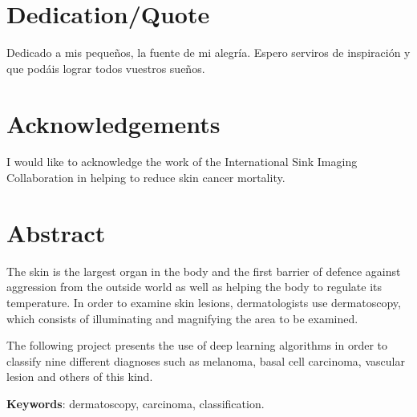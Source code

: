 \chapter*{Dedication/Quote}

Dedicado a mis pequeños, la fuente de mi alegría. Espero serviros de inspiración y que podáis lograr todos vuestros sueños. 

\chapter*{Acknowledgements}

I would like to acknowledge the work of the International Sink Imaging Collaboration \cite{isic_web} in helping to reduce skin cancer mortality.

\chapter*{Abstract}

\onehalfspacing

The skin is the largest organ in the body and the first barrier of defence against aggression from the outside world as well as helping the body to regulate its temperature. In order to examine skin lesions, dermatologists use dermatoscopy, which consists of illuminating and magnifying the area to be examined. 

The following project presents the use of deep learning algorithms in order to classify nine different diagnoses such as melanoma, basal cell carcinoma, vascular lesion and others of this kind.



\vspace{1.5cm}

\textbf{Keywords}: dermatoscopy, carcinoma, classification.

